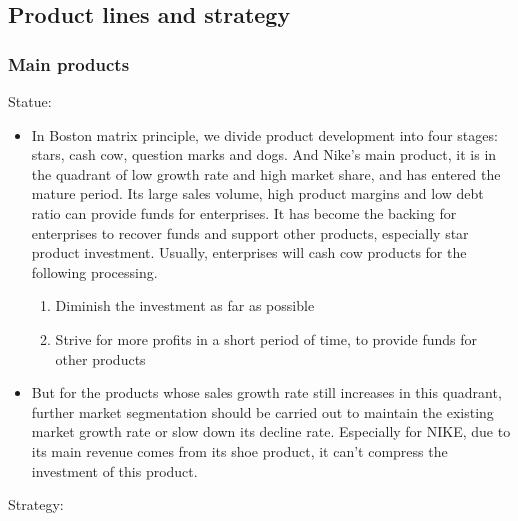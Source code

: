 \documentclass[a4paper, 12pt]{report}
\begin{document}
\subsection{Product lines and strategy}
\subsubsection{Main products}
\par
Statue:
\begin{itemize}
    \item In Boston matrix principle, we divide product development into four stages: stars, cash cow, question marks and dogs. And Nike's main product, it is in the quadrant of low growth rate and high market share, and has entered the mature period. Its large sales volume, high product margins and low debt ratio can provide funds for enterprises. It has become the backing for enterprises to recover funds and support other products, especially star product investment. Usually, enterprises will cash cow products for the following processing.
    \begin{enumerate}
    \item Diminish the investment as far as possible 
    \item Strive for more profits in a short period of time, to provide funds for other products
    \end{enumerate}
    \item But for the products whose sales growth rate still increases in this quadrant, further market segmentation should be carried out to maintain the existing market growth rate or slow down its decline rate. Especially for NIKE, due to its main revenue comes from its shoe product, it can’t compress the investment of this product.
\end{itemize}
Strategy:
\end{document}
